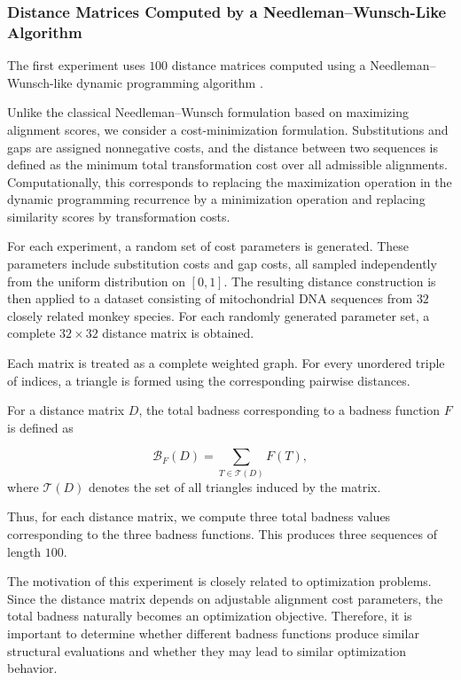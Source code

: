 \documentclass[11pt]{article}
\begin{document}
\subsubsection{Distance Matrices Computed by a Needleman--Wunsch-Like Algorithm}\label{sec:data_nw_like}

The first experiment uses \(100\) distance matrices computed using a Needleman--Wunsch-like dynamic programming algorithm \cite{WATERMAN1976367}. 

Unlike the classical Needleman--Wunsch formulation based on maximizing alignment scores, we consider a cost-minimization formulation. Substitutions and gaps are assigned nonnegative costs, and the distance between two sequences is defined as the minimum total transformation cost over all admissible alignments. Computationally, this corresponds to replacing the maximization operation in the dynamic programming recurrence by a minimization operation and replacing similarity scores by transformation costs.

For each experiment, a random set of cost parameters is generated. These parameters include substitution costs and gap costs, all sampled independently from the uniform distribution on \([0,1]\). The resulting distance construction is then applied to a dataset consisting of mitochondrial DNA sequences from \(32\) closely related monkey species. For each randomly generated parameter set, a complete \(32\times 32\) distance matrix is obtained.

Each matrix is treated as a complete weighted graph. For every unordered triple of indices, a triangle is formed using the corresponding pairwise distances.

For a distance matrix \(D\), the total badness corresponding to a badness function \(F\) is defined as

\[
\mathcal{B}_{F}(D)
=
\sum_{T\in\mathcal{T}(D)} F(T),
\]
where \(\mathcal{T}(D)\) denotes the set of all triangles induced by the matrix.

Thus, for each distance matrix, we compute three total badness values corresponding to the three badness functions. This produces three sequences of length \(100\).

The motivation of this experiment is closely related to optimization problems. Since the distance matrix depends on adjustable alignment cost parameters, the total badness naturally becomes an optimization objective. Therefore, it is important to determine whether different badness functions produce similar structural evaluations and whether they may lead to similar optimization behavior.
\end{document}

